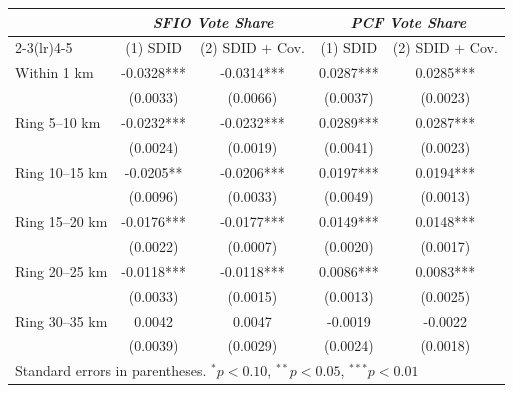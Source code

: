 \begin{tabular}{lcccc}
\toprule
 & \multicolumn{2}{c}{\textit{SFIO Vote Share}} & \multicolumn{2}{c}{\textit{PCF Vote Share}} \\
\cmidrule(lr){2-3}\cmidrule(lr){4-5}
 & (1) SDID & (2) SDID + Cov. & (1) SDID & (2) SDID + Cov. \\
\midrule
Within 1 km & -0.0328*** & -0.0314*** & 0.0287*** & 0.0285*** \\
 & (0.0033) & (0.0066) & (0.0037) & (0.0023) \\
Ring 5--10 km & -0.0232*** & -0.0232*** & 0.0289*** & 0.0287*** \\
 & (0.0024) & (0.0019) & (0.0041) & (0.0023) \\
Ring 10--15 km & -0.0205** & -0.0206*** & 0.0197*** & 0.0194*** \\
 & (0.0096) & (0.0033) & (0.0049) & (0.0013) \\
Ring 15--20 km & -0.0176*** & -0.0177*** & 0.0149*** & 0.0148*** \\
 & (0.0022) & (0.0007) & (0.0020) & (0.0017) \\
Ring 20--25 km & -0.0118*** & -0.0118*** & 0.0086*** & 0.0083*** \\
 & (0.0033) & (0.0015) & (0.0013) & (0.0025) \\
Ring 30--35 km & 0.0042 & 0.0047 & -0.0019 & -0.0022 \\
 & (0.0039) & (0.0029) & (0.0024) & (0.0018) \\
\bottomrule
\multicolumn{5}{l}{\footnotesize Standard errors in parentheses. $^{*}p<0.10$, $^{**}p<0.05$, $^{***}p<0.01$} \\
\end{tabular}
